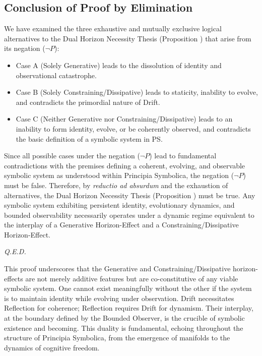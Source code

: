 \subsection{Conclusion of Proof by Elimination}
\label{subsec:appC_conclusion_of_proof_by_elimination}
We have examined the three exhaustive and mutually exclusive logical alternatives to the Dual Horizon Necessity Thesis (Proposition ) that arise from its negation (\(\neg P\)):
\begin{itemize}
    \item Case A (Solely Generative) leads to the dissolution of identity and observational catastrophe.
    \item Case B (Solely Constraining/Dissipative) leads to staticity, inability to evolve, and contradicts the primordial nature of Drift.
    \item Case C (Neither Generative nor Constraining/Dissipative) leads to an inability to form identity, evolve, or be coherently observed, and contradicts the basic definition of a symbolic system in PS.
\end{itemize}
Since all possible cases under the negation (\(\neg P\)) lead to fundamental contradictions with the premises defining a coherent, evolving, and observable symbolic system as understood within Principia Symbolica, the negation (\(\neg P\)) must be false.
Therefore, by \emph{reductio ad absurdum} and the exhaustion of alternatives, the Dual Horizon Necessity Thesis (Proposition ) must be true. Any symbolic system exhibiting persistent identity, evolutionary dynamics, and bounded observability necessarily operates under a dynamic regime equivalent to the interplay of a Generative Horizon-Effect and a Constraining/Dissipative Horizon-Effect.
\begin{flushright}
\textit{Q.E.D.}
\end{flushright}
\begin{scholium}
\label{scholium:appC_two_horizons_co_constitutive}
This proof underscores that the Generative and Constraining/Dissipative horizon-effects are not merely additive features but are co-constitutive of any viable symbolic system. One cannot exist meaningfully without the other if the system is to maintain identity while evolving under observation. Drift necessitates Reflection for coherence; Reflection requires Drift for dynamism. Their interplay, at the boundary defined by the Bounded Observer, is the crucible of symbolic existence and becoming. This duality is fundamental, echoing throughout the structure of Principia Symbolica, from the emergence of manifolds to the dynamics of cognitive freedom.
\end{scholium}
\clearpage
